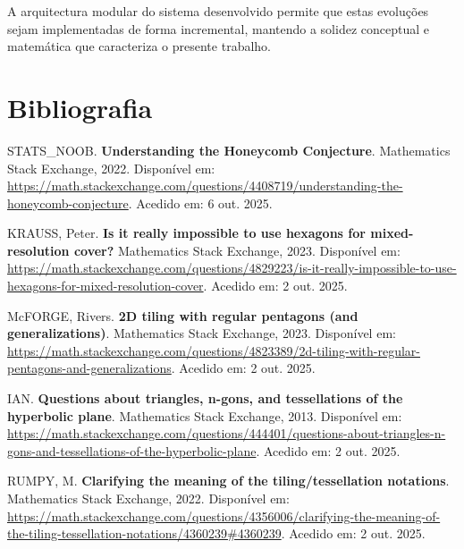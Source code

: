 \documentclass[12pt,a4paper,oneside]{extarticle}
\begin{document}
A arquitectura modular do sistema desenvolvido permite que estas evoluções sejam implementadas de forma incremental, mantendo a solidez conceptual e matemática que caracteriza o presente trabalho.

\clearpage

\section{Bibliografia}

\begin{thebibliography}{9}

STATS\_NOOB. \textbf{Understanding the Honeycomb Conjecture}. Mathematics Stack Exchange, 2022. Disponível em: \url{https://math.stackexchange.com/questions/4408719/understanding-the-honeycomb-conjecture}. Acedido em: 6 out. 2025.

KRAUSS, Peter. \textbf{Is it really impossible to use hexagons for mixed-resolution cover?} Mathematics Stack Exchange, 2023. Disponível em: \url{https://math.stackexchange.com/questions/4829223/is-it-really-impossible-to-use-hexagons-for-mixed-resolution-cover}. Acedido em: 2 out. 2025.

McFORGE, Rivers. \textbf{2D tiling with regular pentagons (and generalizations)}. Mathematics Stack Exchange, 2023. Disponível em: \url{https://math.stackexchange.com/questions/4823389/2d-tiling-with-regular-pentagons-and-generalizations}. Acedido em: 2 out. 2025.

IAN. \textbf{Questions about triangles, n-gons, and tessellations of the hyperbolic plane}. Mathematics Stack Exchange, 2013. Disponível em: \url{https://math.stackexchange.com/questions/444401/questions-about-triangles-n-gons-and-tessellations-of-the-hyperbolic-plane}. Acedido em: 2 out. 2025.

RUMPY, M. \textbf{Clarifying the meaning of the tiling/tessellation notations}. Mathematics Stack Exchange, 2022. Disponível em: \url{https://math.stackexchange.com/questions/4356006/clarifying-the-meaning-of-the-tiling-tessellation-notations/4360239#4360239}. Acedido em: 2 out. 2025.

\end{thebibliography}

\label{fim}
\end{document}

